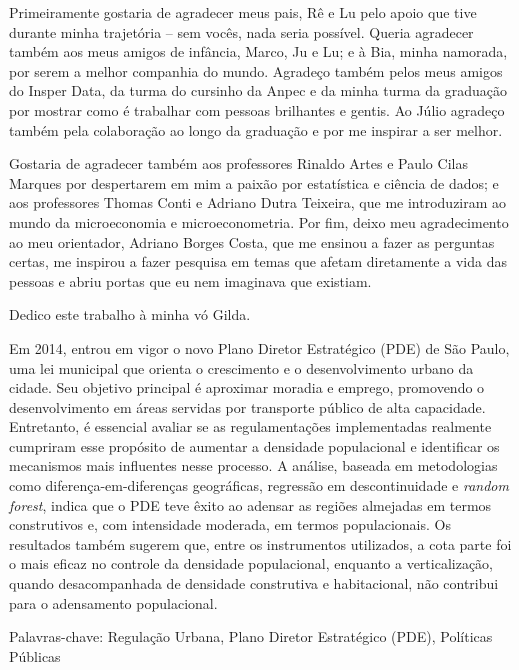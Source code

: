 \documentclass[
  a4paper, 
  12pt, 
  openany, 
  oneside, 
  brazil,
]{abntex2}
\begin{document}
\begin{agradecimentos}



Primeiramente gostaria de agradecer meus pais, Rê e Lu pelo apoio que tive durante minha trajetória -- sem vocês, nada seria possível. Queria agradecer também aos meus amigos de infância, Marco, Ju e Lu; e à Bia, minha namorada, por serem a melhor companhia do mundo. Agradeço também pelos meus amigos do Insper Data, da turma do cursinho da Anpec e da minha turma da graduação por mostrar como é trabalhar com pessoas brilhantes e gentis. Ao Júlio agradeço também pela colaboração ao longo da graduação e por me inspirar a ser melhor.  

Gostaria de agradecer também aos professores Rinaldo Artes e Paulo Cilas Marques por despertarem em mim a paixão por estatística e ciência de dados; e aos professores Thomas Conti e Adriano Dutra Teixeira, que me introduziram ao mundo da microeconomia e microeconometria. Por fim, deixo meu agradecimento ao meu orientador, Adriano Borges Costa, que me ensinou a fazer as perguntas certas, me inspirou a fazer pesquisa em temas que afetam diretamente a vida das pessoas e abriu portas que eu nem imaginava que existiam. 

\bigskip
\raggedleft Dedico este trabalho à minha vó Gilda.

\end{agradecimentos}


\setlength{\absparsep}{18pt} %
\begin{resumo}

Em 2014, entrou em vigor o novo Plano Diretor Estratégico (PDE) de São Paulo, uma lei municipal que orienta o crescimento e o desenvolvimento urbano da cidade. Seu objetivo principal é aproximar moradia e emprego, promovendo o desenvolvimento em áreas servidas por transporte público de alta capacidade. Entretanto, é essencial avaliar se as regulamentações implementadas realmente cumpriram esse propósito de aumentar a densidade populacional e identificar os mecanismos mais influentes nesse processo. A análise, baseada em metodologias como diferença-em-diferenças geográficas, regressão em descontinuidade e \textit{random forest}, indica que o PDE teve êxito ao adensar as regiões almejadas em termos construtivos e, com intensidade moderada, em termos populacionais. Os resultados também sugerem que, entre os instrumentos utilizados, a cota parte foi o mais eficaz no controle da densidade populacional, enquanto a verticalização, quando desacompanhada de densidade construtiva e habitacional, não contribui para o adensamento populacional.

Palavras-chave: Regulação Urbana, Plano Diretor Estratégico (PDE), Políticas Públicas

\end{resumo}
\end{document}
